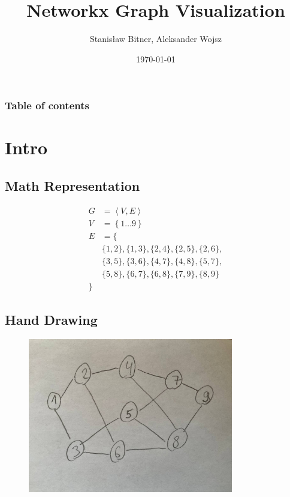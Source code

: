 \documentclass[11pt]{beamer}
\title{Networkx Graph Visualization}
\author{Stanisław Bitner, Aleksander Wojsz}
\date{\today}
\begin{document}
\frame{\titlepage}

\begin{frame}
    \frametitle{Table of contents}
    \tableofcontents[hideallsubsections]
\end{frame}

\section{Intro}

\subsection{Math Representation}
\begin{frame}{\subsecname}
    \begin{align*}
        G &= \left\langle V, E \right\rangle\\
        V &= \left\{ 1 \hdots 9 \right\}\\
        E &= \{\\
            &\{ 1, 2 \}, \{ 1, 3 \}, \{ 2, 4 \}, \{ 2, 5 \}, \{ 2, 6 \},\\
            &\{ 3, 5 \}, \{ 3, 6 \}, \{ 4, 7 \}, \{ 4, 8 \}, \{ 5, 7 \},\\
            &\{ 5, 8 \}, \{ 6, 7 \}, \{ 6, 8 \}, \{ 7, 9 \}, \{ 8, 9 \}\\
        \}
    \end{align*}
\end{frame}

\subsection{Hand Drawing}
\begin{frame}{\subsecname}
    \begin{figure}
        \centering
        \includegraphics[width=0.8\textwidth]{figures/hand1.jpg}
    \end{figure}
\end{frame}
\end{document}
